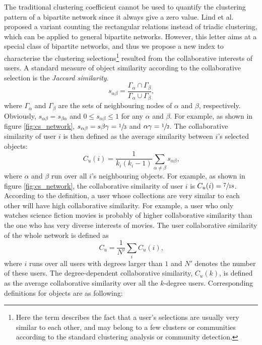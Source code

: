       The traditional clustering coefficient\cite{WattsStrogatz1998} cannot be used to quantify the clustering pattern of a bipartite network since it always give a zero value. Lind et al.\cite{LindGonzalezHerrmann2005} proposed a variant counting the rectangular relations instead of triadic clustering, which can be applied to general bipartite networks. However, this letter aims at a special class of bipartite networks, and thus we propose a new index to characterise the clustering selections\footnote{Here the term  describes the fact that a user's selections are usually very similar to each other, and may belong to a few clusters or communities according to the standard clustering analysis or community detection.} resulted from the collaborative interests of users. A standard measure of object similarity according to the collaborative selection is the \emph{Jaccard similarity}.\cite{Jaccard1901}
      \begin{equation}
        s_{\alpha\beta} = \frac{\Gamma_\alpha \cap \Gamma_\beta}{\Gamma_\alpha \cup \Gamma_\beta}\mbox{,}
      \end{equation}
      where $\Gamma_\alpha$ and $\Gamma_\beta$ are the sets of neighbouring nodes of $\alpha$ and $\beta$, respectively. Obviously, $s_{\alpha\beta} = s_{\beta\alpha}$ and $0 \leq s_{\alpha\beta} \leq 1$ for any $\alpha$ and $\beta$. For example, as shown in figure \ref{fig:cs_network}, $s_{\alpha\beta} = s{\beta\gamma} = \sfrac{1}{3}$ and ${\alpha\gamma} = \sfrac{1}{2}$. The collaborative similarity of user $i$ is then defined as the average similarity between $i$'s selected objects:
      \begin{equation}
        C_u(i) = \frac{1}{k_i(k_i-1)} \sum_{\alpha\neq\beta} s_{\alpha\beta}\mbox{,}
      \end{equation}
      where $\alpha$ and $\beta$ run over all $i$'s neighbouring objects. For example, as shown in figure \ref{fig:cs_network}, the collaborative similarity of user $i$ is $C_u(i) = \sfrac{7}{18}$. According to the definition, a user whose collections are very similar to each other will have high collaborative similarity. For example, a user who only watches science fiction movies is probably of higher collaborative similarity than the one who has very diverse interests of movies. The user collaborative similarity of the whole network is defined as
      \begin{equation}
        C_u = \frac{1}{N\prime} \sum_{i} C_u(i)\mbox{,}
      \end{equation}
      where $i$ runs over all users with degrees larger than $1$ and $N\prime$ denotes the number of these users. The degree-dependent collaborative similarity, $C_u(k)$, is defined as the average collaborative similarity over all the $k$-degree users. Corresponding definitions for objects are as following:
